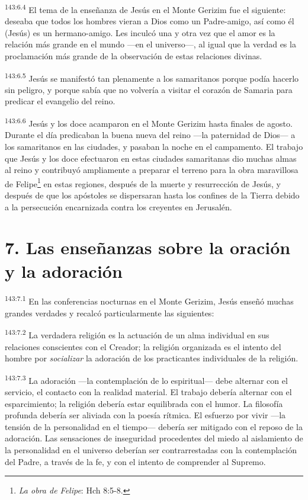 \par
\textsuperscript{143:6.4} El tema de la enseñanza de Jesús en el Monte Gerizim fue el siguiente: deseaba que todos los hombres vieran a Dios como un Padre-amigo, así como él (Jesús) es un hermano-amigo. Les inculcó una y otra vez que el amor es la relación más grande en el mundo ---en el universo---, al igual que la verdad es la proclamación más grande de la observación de estas relaciones divinas.

\par
\textsuperscript{143:6.5} Jesús se manifestó tan plenamente a los samaritanos porque podía hacerlo sin peligro, y porque sabía que no volvería a visitar el corazón de Samaria para predicar el evangelio del reino.

\par
\textsuperscript{143:6.6} Jesús y los doce acamparon en el Monte Gerizim hasta finales de agosto. Durante el día predicaban la buena nueva del reino ---la paternidad de Dios--- a los samaritanos en las ciudades, y pasaban la noche en el campamento. El trabajo que Jesús y los doce efectuaron en estas ciudades samaritanas dio muchas almas al reino y contribuyó ampliamente a preparar el terreno para la obra maravillosa de Felipe\footnote{\textit{La obra de Felipe}: Hch 8:5-8.} en estas regiones, después de la muerte y resurrección de Jesús, y después de que los apóstoles se dispersaran hasta los confines de la Tierra debido a la persecución encarnizada contra los creyentes en Jerusalén.

\section*{7. Las enseñanzas sobre la oración y la adoración}
\par
\textsuperscript{143:7.1} En las conferencias nocturnas en el Monte Gerizim, Jesús enseñó muchas grandes verdades y recalcó particularmente las siguientes:

\par
\textsuperscript{143:7.2} La verdadera religión es la actuación de un alma individual en sus relaciones conscientes con el Creador; la religión organizada es el intento del hombre por \textit{socializar} la adoración de los practicantes individuales de la religión.

\par
\textsuperscript{143:7.3} La adoración ---la contemplación de lo espiritual--- debe alternar con el servicio, el contacto con la realidad material. El trabajo debería alternar con el esparcimiento; la religión debería estar equilibrada con el humor. La filosofía profunda debería ser aliviada con la poesía rítmica. El esfuerzo por vivir ---la tensión de la personalidad en el tiempo--- debería ser mitigado con el reposo de la adoración. Las sensaciones de inseguridad procedentes del miedo al aislamiento de la personalidad en el universo deberían ser contrarrestadas con la contemplación del Padre, a través de la fe, y con el intento de comprender al Supremo.


